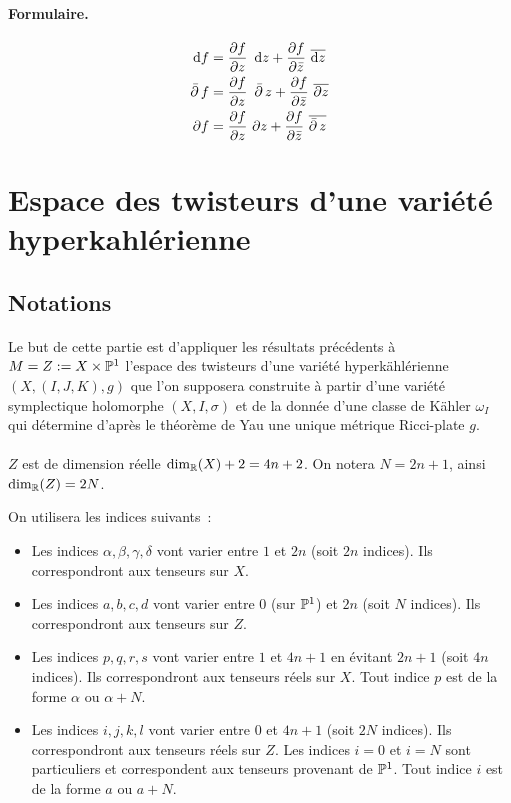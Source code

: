 \documentclass[12pt,draft]{article}
\begin{document}
\paragraph*{Formulaire.}
\begin{align*}
\dd f & = \dpp{f}{z}\ \dd z + \dpp{f}{\bar{z}}\ \overline{\dd z} \\
\dbarre f & = \dpp{f}{z}\ \dbarre z + \dpp{f}{\bar{z}}\ \overline{\partial z} \\
\partial f & = \dpp{f}{z}\ \partial z + \dpp{f}{\bar{z}}\ \overline{\dbarre z}
\end{align*}


\section{Espace des twisteurs d'une variété hyperkahlérienne}
\subsection{Notations}
\cite{Hitchin-Karlhede} \paragraph*{}Le but de cette partie est d'appliquer les résultats précédents à $M=Z :=X \times \mathbb{P}^1$ l'espace des twisteurs d'une variété hyperkählérienne $(X,(I,J,K),g)$ que l'on supposera construite à partir d'une variété symplectique holomorphe $(X,I,\sigma)$ et de la donnée d'une classe de Kähler $\omega_I$ qui détermine d'après le théorème de Yau une unique métrique Ricci-plate $g$. 

\paragraph*{}$Z$ est de dimension réelle $\dim_{\mathbb{R}}(X)+2 = 4n+2$. On notera $N = 2n+1$, ainsi $\dim_{\mathbb{R}}(Z) = 2N$.

On utilisera les indices suivants~:
\begin{itemize}
\item Les indices $\alpha,\beta,\gamma,\delta$ vont varier entre $1$ et $2n$ (soit $2n$ indices). Ils correspondront aux tenseurs sur $X$.
\item Les indices $a,b,c,d$ vont varier entre $0$ (sur $\mathbb{P}^1$) et $2n$ (soit $N$ indices). Ils correspondront aux tenseurs sur $Z$.
\item Les indices $p,q,r,s$ vont varier entre $1$ et $4n+1$ en évitant $2n+1$ (soit $4n$ indices). Ils correspondront aux tenseurs réels sur $X$. Tout indice $p$ est de la forme $\alpha$ ou $\alpha+N$.
\item Les indices $i,j,k,l$ vont varier entre $0$ et $4n+1$ (soit $2N$ indices). Ils correspondront aux tenseurs réels sur $Z$. Les indices $i=0$ et $i=N$ sont particuliers et correspondent aux tenseurs provenant de $\mathbb{P}^1$. Tout indice $i$ est de la forme $a$ ou $a+N$.
\end{itemize}
\end{document}

